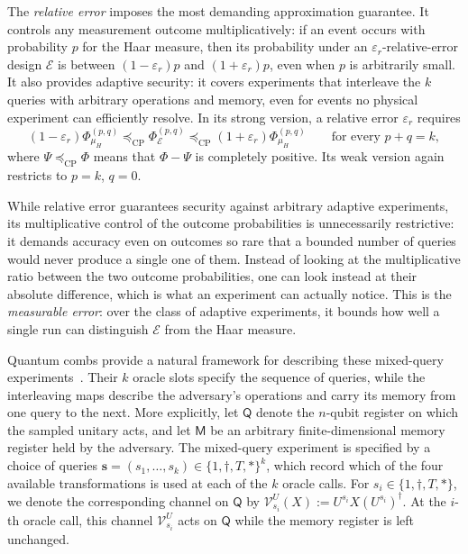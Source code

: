 \documentclass[
    aps,
    superscriptaddress,
    onecolumn,
    10pt,
    prx,
    nofootinbib
]{revtex4-2}
\newcommand{\cE}{\mathcal E}
\theoremstyle{namedstatement}
\theoremstyle{plain}
\begin{document}
The \emph{relative error} imposes the most demanding approximation guarantee. It controls any measurement outcome multiplicatively: if an event occurs with probability $p$ for the Haar measure, then its probability under an $\varepsilon_{r}$-relative-error design $\cE$ is between $(1-\varepsilon_{r})p$ and $(1+\varepsilon_{r})p$, even when $p$ is arbitrarily small. It also provides adaptive security:  it covers experiments that interleave the $k$ queries with arbitrary operations and memory, even for events no physical experiment can efficiently resolve. In its strong version, a relative error $\varepsilon_{r}$ requires
\begin{equation}\label{eq:strong-relative-main}
    (1-\varepsilon_{r})\Phi_{\mu_H}^{(p,q)}
    \preceq_{\mathrm{CP}}
    \Phi_{\cE}^{(p,q)}
    \preceq_{\mathrm{CP}}
    (1+\varepsilon_{r})\Phi_{\mu_H}^{(p,q)}
    \qquad
    \text{for every }p+q=k,
\end{equation}
where $\Psi\preceq_{\mathrm{CP}}\Phi$ means that $\Phi-\Psi$ is completely positive. Its weak version again restricts to $p=k$, $q=0$.

While relative error guarantees security against arbitrary adaptive experiments, its multiplicative control of the outcome probabilities is
unnecessarily restrictive: it demands accuracy even on outcomes so rare that a
bounded number of queries would never produce a single one of them. Instead of looking at the multiplicative ratio between the two outcome probabilities, one can look instead at their absolute difference, which is what an experiment can actually notice. This is the \emph{measurable error}: over the class of adaptive experiments, it bounds how
well a single run can distinguish $\mathcal{E}$ from the Haar measure.


Quantum combs provide a natural framework for describing these mixed-query experiments~\cite{ChiribellaEtAl2009}. Their $k$ oracle slots specify the sequence of queries, while the interleaving maps describe the adversary's operations and carry its memory from one query to the next.
More explicitly, let $\mathsf{Q}$ denote the $n$-qubit register on which the sampled unitary acts, and let $\mathsf{M}$ be an arbitrary finite-dimensional memory register held by the adversary. The mixed-query experiment is specified by a choice of queries $\bm s=(s_1,\ldots,s_k)\in\{1,\dagger,T,*\}^k$, which record which of the four available transformations is used at each of the $k$ oracle calls. For $s_i\in\{1,\dagger,T,*\}$, we denote the corresponding channel on $\mathsf{Q}$ by $\mathcal V_{s_i}^U(X):=U^{s_i}X(U^{s_i})^\dagger$. At the $i$-th oracle call, this channel $\mathcal V_{s_i}^U$ acts on $\mathsf{Q}$ while the memory register is left unchanged.
\end{document}
